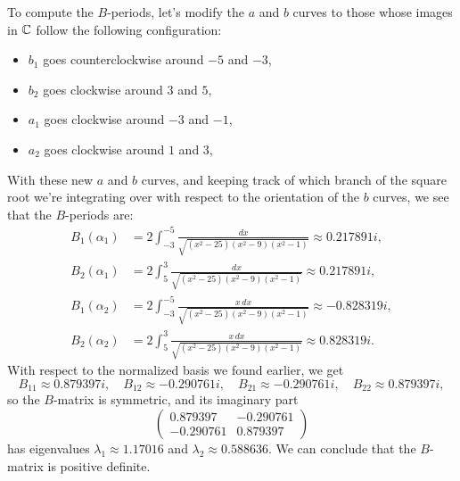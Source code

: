 \documentclass[expanded]{lkx_pset}
\begin{document}
\begin{parts}
	To compute the $B$-periods, let's modify the $a$ and $b$ curves to those whose images in $\mathbb{C}$ follow the following configuration:
	\begin{itemize}
		\item $b_1$ goes counterclockwise around $-5$ and $-3$,
		\item $b_2$ goes clockwise around $3$ and $5$,
		\item $a_1$ goes clockwise around $-3$ and $-1$,
		\item $a_2$ goes clockwise around $1$ and $3$,
	\end{itemize}
	With these new $a$ and $b$ curves, and keeping track of which branch of the square root we're integrating over with respect to the orientation of the $b$ curves, we see that the $B$-periods are:
	\[
		\begin{aligned}
			B_1(\alpha_1) & = 2\int_{-3}^{-5} \frac{dx}{\sqrt{(x^2-25)(x^2-9)(x^2-1)}}\approx 0.217891i,     \\
			B_2(\alpha_1) & = 2\int_5^3 \frac{dx}{\sqrt{(x^2-25)(x^2-9)(x^2-1)}}\approx 0.217891i,           \\
			B_1(\alpha_2) & = 2\int_{-3}^{-5}\frac{x\, dx}{\sqrt{(x^2-25)(x^2-9)(x^2-1)}}\approx -0.828319i, \\
			B_2(\alpha_2) & = 2\int_5^3 \frac{x\, dx}{\sqrt{(x^2-25)(x^2-9)(x^2-1)}}\approx 0.828319i.
		\end{aligned}
	\]
	With respect to the normalized basis we found earlier, we get
	\[
		B_{11}\approx 0.879397i,\quad B_{12}\approx -0.290761i,\quad B_{21}\approx -0.290761i,\quad B_{22}\approx 0.879397i,
	\]
	so the $B$-matrix is symmetric, and its imaginary part
	\[
		\begin{pmatrix}
			0.879397  & -0.290761 \\
			-0.290761 & 0.879397
		\end{pmatrix}
	\]
	has eigenvalues $\lambda_1\approx 1.17016$ and $\lambda_2\approx 0.588636$. We can conclude that the $B$-matrix is positive definite.
\end{parts}
\end{document}
